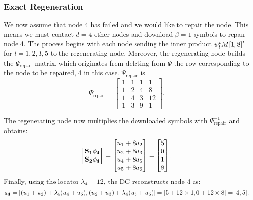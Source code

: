 \documentclass{article}
\begin{document}
\subsubsection*{Exact Regeneration}
We now assume that node 4 has failed and we would like to repair the node. This means we must contact $d=4$ other nodes and download $\beta=1$ symbols to repair node 4. The process begins with each node sending the inner product $\vb{\psi}_{l}^t M[1,8]^t$ for $l = 1,2,3,5$ to the  regenerating node. Moreover, the  regenerating node builds the $\Psi_{\text{repair}}$ matrix, which originates from deleting from $\Psi$ the row corresponding to the node to be repaired, 4 in this case. $\Psi_{\text{repair}}$ is
\begin{equation*}
\Psi_{\text{repair}} =
\begin{bmatrix}
1 & 1 & 1 & 1 \\
1 & 2 & 4 & 8 \\
1 & 4 & 3 & 12 \\
1 & 3 & 9 & 1 
\end{bmatrix}.
\end{equation*}

The regenerating node now multiplies the downloaded symbols with $\Psi_{\text{repair}}^{-1}$ and obtains:
\begin{equation*}
\begin{bmatrix}
\vb{S_1}\vb{\phi_4}\\
\vb{S_2}\vb{\phi_4}\\
\end{bmatrix}
=
\begin{bmatrix}
u_1+8u_2 \\
u_2+8u_3 \\
u_4+8u_5 \\
u_5+8u_6 \\
\end{bmatrix}
=
\begin{bmatrix}
5 \\
0 \\
1 \\
8 \\
\end{bmatrix}.
\end{equation*}
Finally, using the locator $\lambda_4 = 12$, the DC reconstructs node 4 as:
\begin{equation*}
\vb{s_4} = [(u_1 + u_2)+\lambda_4(u_4 + u_5), (u_2 + u_3)+\lambda_4(u_5 + u_6)] = [5+12\times 1, 0 + 12\times 8] = [4, 5].
\end{equation*}
\end{document}
